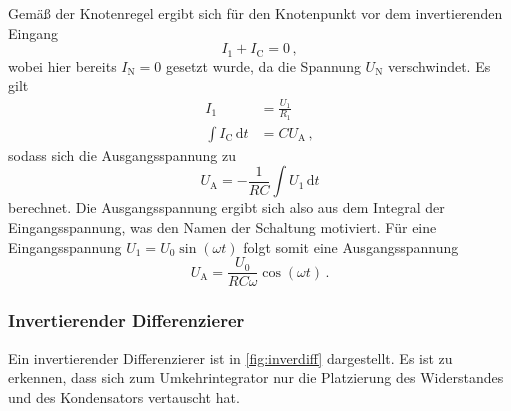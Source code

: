 
\noindent
Gemäß der Knotenregel ergibt sich für den Knotenpunkt vor dem invertierenden Eingang 
\begin{equation*}
    I_1 + I_\text{C} = 0\, ,
\end{equation*}
wobei hier bereits $I_\text{N} = 0$ gesetzt wurde, da die Spannung $U_\text{N}$ verschwindet. Es gilt 
\begin{align*}
    I_1 &= \frac{U_1}{R_1} \\ 
    \int I_\text{C} \, \text{d}t &= C U_\text{A}\, ,
\end{align*}
sodass sich die Ausgangsspannung zu 
\begin{equation*}
    U_\text{A} = - \frac{1}{RC} \int U_1 \, \text{d}t
\end{equation*}
berechnet. Die Ausgangsspannung ergibt sich also aus dem Integral der Eingangsspannung, was den Namen der Schaltung motiviert. Für eine Eingangsspannung $U_1 = U_0 \sin(\omega t)$ folgt somit eine Ausgangsspannung 
\begin{equation}
    U_\text{A} = \frac{U_0}{RC\omega} \cos(\omega t)\, .
    \label{eqn:int}
\end{equation}

\subsubsection{Invertierender Differenzierer}

\noindent
Ein invertierender Differenzierer ist in \autoref{fig:inverdiff} dargestellt. Es ist zu erkennen, dass sich zum Umkehrintegrator nur die Platzierung des Widerstandes und des Kondensators vertauscht hat.



